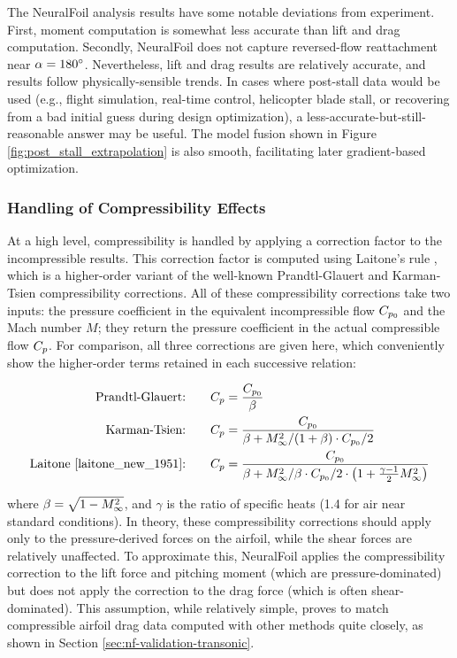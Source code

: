     The NeuralFoil analysis results have some notable deviations from experiment. First, moment computation is somewhat less accurate than lift and drag computation. Secondly, NeuralFoil does not capture reversed-flow reattachment near $\alpha=180\degree$. Nevertheless, lift and drag results are relatively accurate, and results follow physically-sensible trends. In cases where post-stall data would be used (e.g., flight simulation, real-time control, helicopter blade stall, or recovering from a bad initial guess during design optimization), a less-accurate-but-still-reasonable answer may be useful. The model fusion shown in Figure \ref{fig:post_stall_extrapolation} is also smooth, facilitating later gradient-based optimization.

    \subsubsection{Handling of Compressibility Effects}
    \label{sec:nf-compressibility}

    At a high level, compressibility is handled by applying a correction factor to the incompressible results. This correction factor is computed using Laitone's rule \cite{laitone_new_1951}, which is a higher-order variant of the well-known Prandtl-Glauert and Karman-Tsien compressibility corrections. All of these compressibility corrections take two inputs: the pressure coefficient in the equivalent incompressible flow $C_{p_0}$ and the Mach number $M$; they return the pressure coefficient in the actual compressible flow $C_p$. For comparison, all three corrections are given here, which conveniently show the higher-order terms retained in each successive relation:

    \begin{align}
        \label{eq:prandtl-glauert} \text{Prandtl-Glauert:} \qquad & C_p = \frac{C_{p_0}}{\beta} \\
        \label{eq:karman-tsien} \text{Karman-Tsien:}\qquad    & C_p = \frac{C_{p_0}}{\beta + M_\infty^2 / (1 + \beta) \cdot C_{p_0} / 2} \\
        \label{eq:laitone} \text{Laitone \cite{laitone_new_1951}:}\qquad & C_p = \frac{C_{p_0}}{\beta + M_\infty^2 / \beta \cdot C_{p_0} / 2 \cdot \left( 1 + \frac{\gamma - 1}{2} M_\infty^2 \right)}
    \end{align}

    \noindent where $\beta = \sqrt{1- M_\infty^2}$, and $\gamma$ is the ratio of specific heats (1.4 for air near standard conditions). In theory, these compressibility corrections should apply only to the pressure-derived forces on the airfoil, while the shear forces are relatively unaffected. To approximate this, NeuralFoil applies the compressibility correction to the lift force and pitching moment (which are pressure-dominated) but does not apply the correction to the drag force (which is often shear-dominated). This assumption, while relatively simple, proves to match compressible airfoil drag data computed with other methods quite closely, as shown in Section \ref{sec:nf-validation-transonic}.

